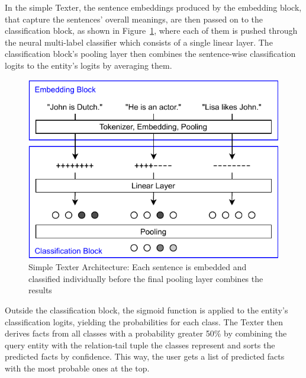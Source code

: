 In the simple Texter, the sentence embeddings produced by the embedding block, that capture the sentences' overall meanings, are then passed on to the classification block, as shown in Figure~\ref{fig:4_approach/1_texter/2_simple_model/simple_architecture}, where each of them is pushed through the neural multi-label classifier which consists of a single linear layer. The classification block's pooling layer then combines the sentence-wise classification logits to the entity's logits by averaging them.

\begin{figure}[t]
    \centering
    \includegraphics{4_approach/1_texter/2_simple_model/simple_architecture}
    \caption{Simple Texter Architecture: Each sentence is embedded and classified individually before the final pooling layer combines the results}
    \label{fig:4_approach/1_texter/2_simple_model/simple_architecture}
\end{figure}

Outside the classification block, the sigmoid function is applied to the entity's classification logits, yielding the probabilities for each class. The Texter then derives facts from all classes with a probability greater 50\% by combining the query entity with the relation-tail tuple the classes represent and sorts the predicted facts by confidence. This way, the user gets a list of predicted facts with the most probable ones at the top.

